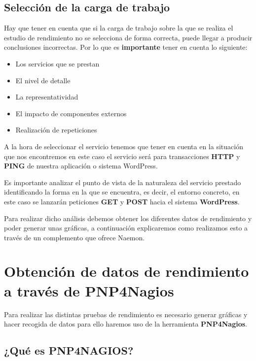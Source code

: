 


\subsection{Selección de la carga de trabajo}
Hay que tener en cuenta que si la carga de trabajo sobre la que se realiza el estudio de rendimiento no se selecciona de forma correcta, puede llegar a producir conclusiones incorrectas.
\newpage
Por lo que es \textbf{importante} tener en cuenta lo siguiente:
\begin{itemize}
	\item Los servicios que se prestan
	\item El nivel de detalle
	\item La representatividad
	\item El impacto de componentes externos
	\item Realización de repeticiones
\end{itemize}

A la hora de seleccionar el servicio tenemos que tener en cuenta en la situación que nos encontremos en este caso el servicio será para transacciones \textbf{HTTP} y \textbf{PING} de nuestra aplicación o sistema WordPress.

Es importante analizar el punto de vista de la naturaleza del servicio prestado identificando la forma en la que se encuentra, es decir, el entorno concreto, en este caso se lanzarán peticiones \textbf{GET} y \textbf{POST} hacia el sistema \textbf{WordPress}.

Para realizar dicho análisis debemos obtener los diferentes datos de rendimiento y poder generar unas gráficas, a continuación explicaremos como realizamos esto a través de un complemento que ofrece Naemon.
\section{Obtención de datos de rendimiento a través de PNP4Nagios}

Para realizar las distintas pruebas de rendimiento es necesario generar gráficas y hacer recogida de datos para ello haremos uso de la herramienta \textbf{PNP4Nagios}.

\subsection{¿Qué es PNP4NAGIOS?}

